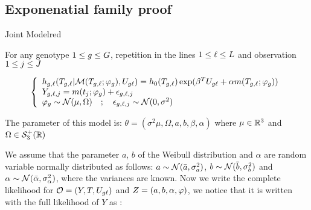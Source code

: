 \documentclass[a4paper]{article}
\begin{document}
\newpage

    \begin{myAppendix}
    
\subsection{Exponenatial family proof}

\begin{myBoxedEnv}{Joint Model}{\bccrayon}{red}
    
    For any genotype $\foranygeno$,  repetition in the lines  $\foranylines$ and observation $\foranyobs$
    
    \begin{equation}\label{jointmodel}
        \stackeq[lll]{ 
            \hazard_\genolines (T_\genolines|\mc M(T_\genolines;\vphi_\geno), U_\meltgenolines) 
                = \hazard_0(T_\genolines) \exp(\beta ^T U_\meltgenolines + \alpha \nonlinearfct(T_\genolines;\vphi_\geno) )
        \\  Y_\genolinesobs = \nonlinearfct(t_\obs ; \vphi_\geno )  + \epsilon_\genolinesobs 
        \\  \vphi_\geno \sim \mc N(\mu, \Omega) \quad  ;  \quad  \epsilon_\genolinesobs \sim \mc N(0,\sigma^2) }
    \end{equation}
    
    The parameter of this model is: $\theta = (\sigma^2\mu, \Omega, a,b, \beta, \alpha)$ where $\mu\in\setr^3$ and $\Omega\in\mc S^+_3(\setr)$
\end{myBoxedEnv}

We assume that the parameter $a$, $b$ of the Weibull distribution and $\alpha$ are random variable normally distributed as follows: $a\sim\mc N(\bar a,\sigma_a^2)$, $b\sim \mc N(\bar b, \sigma_b^2)$ and $ \alpha\sim \mc N(\bar \alpha, \sigma_ \alpha^2)$, where the variances are known. Now we write the complete likelihood for $\varobs = (Y,T, U_\meltgenolines)$ and $\varlat = (a,b,\alpha,\vphi)$, we notice that it is written with the full likelihood of $Y$ as :


\end{myAppendix}
\end{document}
